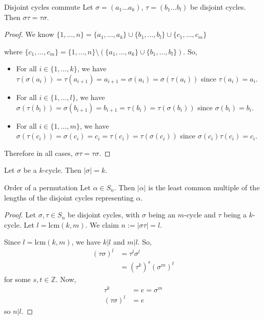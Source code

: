 \documentclass[12pt]{article}
\newcommand{\Z}{\mathbb{Z}}
\begin{document}
	\begin{mythm}{Disjoint cycles commute}{}
		Let $\sigma=(a_1\dots a_k)$, $\tau=(b_1\dots b_l)$ be disjoint cycles. Then $\sigma\tau=\tau\sigma$.
		\begin{proof}
			We know $\{1, \dots, n\}=\{a_1, \dots, a_k\}\cup\{b_1, \dots, b_l\}\cup\{c_1, \dots, c_m\}$
			
			where $\{c_1, \dots, c_m\}=\{1, \dots, n\}\setminus(\{a_1, \dots, a_k\}\cup\{b_1, \dots, b_l\})$. So,
			\begin{itemize}
				\item For all $i\in\{1, \dots, k\}$, we have $\tau(\sigma(a_i))=\tau(a_{i+1})=a_{i+1}=\sigma(a_i)=\sigma(\tau(a_i))$ since $\tau(a_i)=a_i$.
				\item For all $i\in\{1, \dots, l\}$, we have $\sigma(\tau(b_i))=\sigma(b_{i+1})=b_{i+1}=\tau(b_i)=\tau(\sigma(b_i))$ since $\sigma(b_i)=b_i$.
				\item For all $i\in\{1, \dots, m\}$, we have $\sigma(\tau(c_i))=\sigma(c_i)=c_i=\tau(c_i)=\tau(\sigma(c_i))$ since $\sigma(c_i)\tau(c_i)=c_i$.
			\end{itemize}
			 Therefore in all cases, $\sigma\tau=\tau\sigma$.
		\end{proof}
	\end{mythm}
	
	\begin{myrem}{}{}
		Let $\sigma$ be a $k$-cycle. Then $|\sigma|=k$.
	\end{myrem}
	
	\begin{mythm}{Order of a permutation}{}
		Let $\alpha\in S_n$. Then $|\alpha|$ is the least common multiple of the lengths of the disjoint cycles representing $\alpha$.
		\begin{proof}
			Let $\sigma, \tau\in S_n$ be disjoint cycles, with $\sigma$ being an $m$-cycle and $\tau$ being a $k$-cycle. Let $l=\text{lcm}(k, m)$. We claim $n:=|\sigma\tau|=l$.
			
			Since $l=\text{lcm}(k, m)$, we have $k|l$ and $m|l$. So,
			\begin{align*}
				(\tau\sigma)^l&=\tau^l\sigma^l\\
				&=(\tau^k)^s(\sigma^m)^t
			\end{align*}
			for some $s, t\in\Z$. Now,
			\begin{align*}
				\tau^k&=e=\sigma^m\\
				(\tau\sigma)^l&=e
			\end{align*}
			so $n|l$.
		\end{proof}
	\end{mythm}
\end{document}
